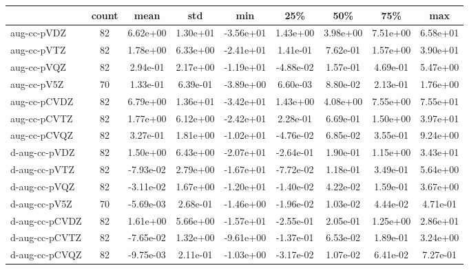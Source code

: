 \begin{tabular}{lSSSSSSSS}
\toprule
{} & {count} & {mean} & {std} & {min} & {25\%} & {50\%} & {75\%} & {max} \\
\midrule
aug-cc-pVDZ & 82 & 6.62e+00 & 1.30e+01 & -3.56e+01 & 1.43e+00 & 3.98e+00 & 7.51e+00 & 6.58e+01 \\
aug-cc-pVTZ & 82 & 1.78e+00 & 6.33e+00 & -2.41e+01 & 1.41e-01 & 7.62e-01 & 1.57e+00 & 3.90e+01 \\
aug-cc-pVQZ & 82 & 2.94e-01 & 2.17e+00 & -1.19e+01 & -4.88e-02 & 1.57e-01 & 4.69e-01 & 5.47e+00 \\
aug-cc-pV5Z & 70 & 1.33e-01 & 6.39e-01 & -3.89e+00 & 6.60e-03 & 8.80e-02 & 2.13e-01 & 1.76e+00 \\
aug-cc-pCVDZ & 82 & 6.79e+00 & 1.36e+01 & -3.42e+01 & 1.43e+00 & 4.08e+00 & 7.55e+00 & 7.55e+01 \\
aug-cc-pCVTZ & 82 & 1.77e+00 & 6.12e+00 & -2.42e+01 & 2.28e-01 & 6.69e-01 & 1.50e+00 & 3.97e+01 \\
aug-cc-pCVQZ & 82 & 3.27e-01 & 1.81e+00 & -1.02e+01 & -4.76e-02 & 6.85e-02 & 3.55e-01 & 9.24e+00 \\
d-aug-cc-pVDZ & 82 & 1.50e+00 & 6.43e+00 & -2.07e+01 & -2.64e-01 & 1.90e-01 & 1.15e+00 & 3.43e+01 \\
d-aug-cc-pVTZ & 82 & -7.93e-02 & 2.79e+00 & -1.67e+01 & -7.72e-02 & 1.18e-01 & 3.49e-01 & 5.64e+00 \\
d-aug-cc-pVQZ & 82 & -3.11e-02 & 1.67e+00 & -1.20e+01 & -1.40e-02 & 4.22e-02 & 1.59e-01 & 3.67e+00 \\
d-aug-cc-pV5Z & 70 & -5.69e-03 & 2.68e-01 & -1.46e+00 & -1.96e-02 & 1.03e-02 & 4.44e-02 & 4.71e-01 \\
d-aug-cc-pCVDZ & 82 & 1.61e+00 & 5.66e+00 & -1.57e+01 & -2.55e-01 & 2.05e-01 & 1.25e+00 & 2.86e+01 \\
d-aug-cc-pCVTZ & 82 & -7.65e-02 & 1.32e+00 & -9.61e+00 & -1.37e-01 & 6.53e-02 & 1.89e-01 & 3.24e+00 \\
d-aug-cc-pCVQZ & 82 & -9.75e-03 & 2.11e-01 & -1.03e+00 & -3.17e-02 & 1.07e-02 & 6.41e-02 & 7.27e-01 \\
\bottomrule
\end{tabular}

